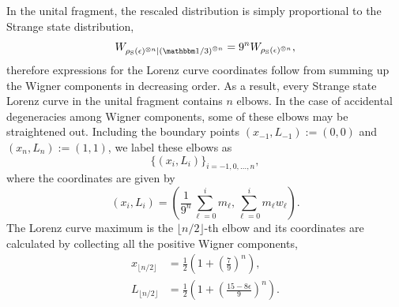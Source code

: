 \documentclass[pra,
aps,
twocolumn,
superscriptaddress,
groupedaddress,
nofootinbib,
reprint
]{revtex4-1}
\begin{document}
In the unital fragment, the rescaled distribution is simply proportional to the Strange state distribution,
\begin{equation}
	W_{\rho_{\rm{S}}(\epsilon)^{\otimes n}|\left(\id/3\right)^{\otimes n}} = 9^n W_{\rho_{\rm{S}}(\epsilon)^{\otimes n}},
\end{equation}
therefore expressions for the Lorenz curve coordinates follow from summing up the Wigner components in decreasing order.
As a result, every Strange state Lorenz curve in the unital fragment contains $n$ elbows. In the case of accidental degeneracies among Wigner components, some of these elbows may be straightened out.
Including the boundary points $(x_{-1}, L_{-1}) := (0,0)$ and $(x_{n}, L_{n}) := (1,1)$, we label these elbows as 
\begin{equation*}
\{(x_{i}, L_{i})\}_{i=-1,0,\dots,n},
\end{equation*}
where the coordinates are given by
\begin{equation}
	(x_{i}, L_{i}) = \left( \frac{1}{9^n}\sum_{\ell=0}^i m_{\ell}, \sum_{\ell=0}^i m_{\ell} w_{\ell} \right).
\end{equation}
The Lorenz curve maximum is the $\lfloor n/2 \rfloor$-th elbow and its coordinates are calculated by collecting all the positive Wigner components,
\begin{align}
	x_{\lfloor n/2 \rfloor} &= \frac{1}{2}\left(1 + \left(\frac{7}{9}\right)^n\right), \\
	L_{\lfloor n/2 \rfloor} &= \frac{1}{2}\left (1 + \left(\frac{15 - 8\epsilon}{9}\right)^n \right).
\end{align}
\end{document}
